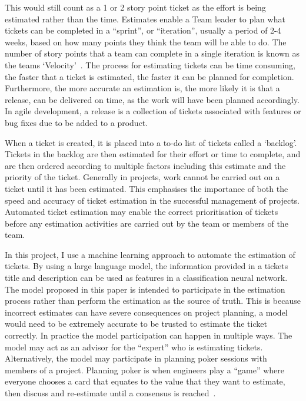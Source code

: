 \documentclass{UoYCSproject}
\begin{document}
    This would still count as a 1 or 2 story point ticket as the effort is being estimated rather than the time.
    Estimates enable a Team leader to plan what tickets can be completed in a “sprint”, or “iteration”, usually a period of 2-4 weeks, based on how many points they think the team will be able to do.
    The number of story points that a team can complete in a single iteration is known as the teams `Velocity'~\cite{cohn2005agile}.
    The process for estimating tickets can be time consuming, the faster that a ticket is estimated, the faster it can be planned for completion.
    Furthermore, the more accurate an estimation is, the more likely it is that a release, can be delivered on time, as the work will have been planned accordingly.
In agile development, a release is a collection of tickets associated with features or bug fixes due to be added to a product. \par

    When a ticket is created, it is placed into a to-do list of tickets called a `backlog'.
    Tickets in the backlog are then estimated for their effort or time to complete, and are then ordered according to multiple factors including this estimate and the priority of the ticket.
    Generally in projects, work cannot be carried out on a ticket until it has been estimated.
    This emphasises the importance of both the speed and accuracy of ticket estimation in the successful management of projects.
    Automated ticket estimation may enable the correct prioritisation of tickets before any estimation activities are carried out by the team or members of the team. \par

    In this project, I use a machine learning approach to automate the estimation of tickets.
    By using a large language model, the information provided in a tickets title and description can be used as features in a classification neural network.
    The model proposed in this paper is intended to participate in the estimation process rather than perform the estimation as the source of truth.
    This is because incorrect estimates can have severe consequences on project planning, a model would need to be extremely accurate to be trusted to estimate the ticket correctly.
    In practice the model participation can happen in multiple ways.
    The model may act as an advisor for the “expert” who is estimating tickets.
    Alternatively, the model may participate in planning poker sessions with members of a project.
    Planning poker is when engineers play a “game” where everyone chooses a card that equates to the value that they want to estimate, then discuss and re-estimate until a consensus is reached~\cite{1667560}. \par
\end{document}
